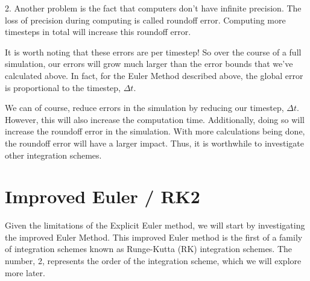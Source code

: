 \documentclass[12pt]{report}
\begin{document}
2. Another problem is the fact that computers don’t have infinite precision. The loss of precision during computing is called \gls{roundoff error}. Computing more timesteps in total will increase this \gls{roundoff error}.

It is worth noting that these errors are per timestep! So over the course of a full simulation, our errors will grow much larger than the error bounds that we’ve calculated above. In fact, for the Euler Method described above, the global error is proportional to the timestep, $\Delta t$.

We can of course, reduce errors in the simulation by reducing our timestep, $\Delta t$. However, this will also increase the computation time. Additionally, doing so will increase the \gls{roundoff error} in the simulation. With more calculations being done, the \gls{roundoff error} will have a larger impact. Thus, it is worthwhile to investigate other integration schemes.

\section{Improved Euler / RK2}
Given the limitations of the Explicit Euler method, we will start by investigating the improved Euler Method. This improved Euler method is the first of a family of integration schemes known as Runge-Kutta (RK) integration schemes. The number, 2, represents the order of the integration scheme, which we will explore more later.
\end{document}
